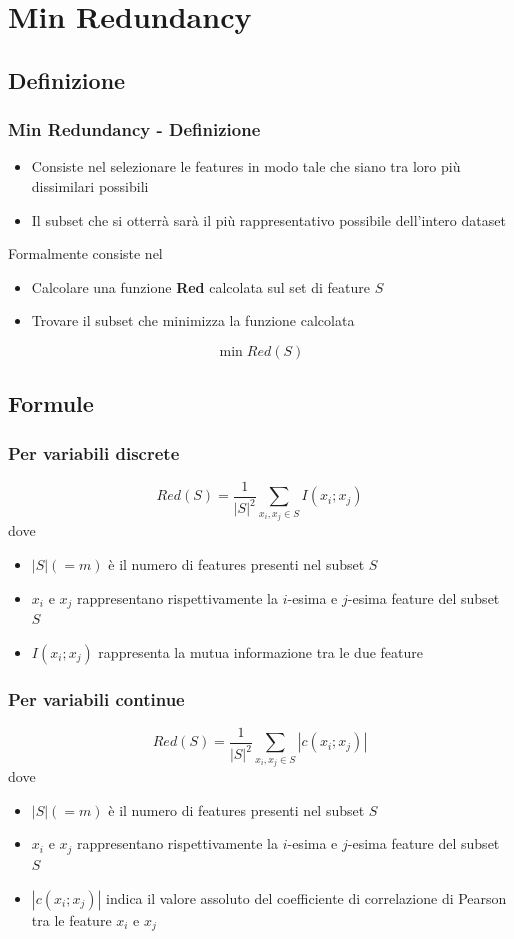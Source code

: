 \documentclass{beamer}
\begin{document}
\section{Min Redundancy}
\subsection{Definizione}
\begin{frame}
	\frametitle{Min Redundancy - Definizione}
	\begin{itemize}
		\item Consiste nel selezionare le features in modo tale che siano tra loro più dissimilari possibili
		\item Il subset che si otterrà sarà il più rappresentativo possibile dell'intero dataset
	\end{itemize}
	Formalmente consiste nel 
	\begin{itemize}
	\item Calcolare una funzione \textbf{Red} calcolata sul set di feature $S$
	\item Trovare il subset che minimizza la funzione calcolata
	\end{itemize}
	$$\min Red(S)$$
\end{frame}

\subsection{Formule}
\begin{frame}
	\frametitle{Per variabili discrete}
	$$Red (S)= \frac{1}{|S|^2} \sum\limits_{x_i,x_j \in S} I (x_i;x_j)$$
	dove 
	\begin{itemize}
		\item $|S|(= m)$ è il numero di features presenti nel subset $S$
		\item $x_i$ e $x_j$ rappresentano rispettivamente la $i$-esima e $j$-esima feature del subset $S$
		\item $I (x_i;x_j)$ rappresenta la mutua informazione tra le due feature
	\end{itemize}
\end{frame}

\begin{frame}
	\frametitle{Per variabili continue}
	$$Red(S)= \frac{1}{|S|^2} \sum\limits_{x_i,x_j \in S} |c (x_i;x_j)|$$
	dove 
	\begin{itemize}
		\item $|S|(= m)$ è il numero di features presenti nel subset $S$
		\item $x_i$ e $x_j$ rappresentano rispettivamente la $i$-esima e $j$-esima feature del subset $S$
		\item $|c (x_i;x_j)|$ indica il valore assoluto del coefficiente di correlazione di Pearson tra le feature $x_i$ e $x_j$
	\end{itemize}
\end{frame}
\end{document}
